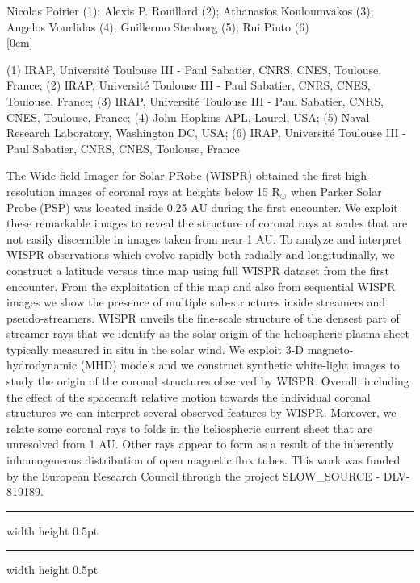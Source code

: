 \documentclass[a4paper,11pt]{book}
\def\doubleline{
\hrule width \hsize height 0.5pt  \kern 1mm \hrule width \hsize height 0.5pt 
}
\begin{document}
\begin{center}
{\large Nicolas Poirier (1)};{ \large Alexis P. Rouillard (2)};{ \large Athanasios Kouloumvakos (3)};{ \large Angelos Vourlidas (4)};{ \large Guillermo Stenborg (5)};{ \large Rui Pinto (6)}\\



[0cm]



     
  
\vspace{2 mm}
\noindent (1) IRAP, Université Toulouse III - Paul Sabatier, CNRS, CNES, Toulouse, France; (2) IRAP, Université Toulouse III - Paul Sabatier, CNRS, CNES, Toulouse, France; (3) IRAP, Université Toulouse III - Paul Sabatier, CNRS, CNES, Toulouse, France; (4) John Hopkins APL, Laurel, USA; (5) Naval Research Laboratory, Washington DC, USA; (6) IRAP, Université Toulouse III - Paul Sabatier, CNRS, CNES, Toulouse, France\\

\end{center}



  
\vspace{2 mm}
\noindent The Wide-field Imager for Solar PRobe (WISPR) obtained the first high-resolution images of coronal rays at heights below 15 R$_\odot$ when Parker Solar Probe (PSP) was located inside 0.25 AU during the first encounter. We exploit these remarkable images to reveal the structure of coronal rays at scales that are not easily discernible in images taken from near 1 AU. To analyze and interpret WISPR observations which evolve rapidly both radially and longitudinally, we construct a latitude versus time map using full WISPR dataset from the first encounter. From the exploitation of this map and also from sequential WISPR images we show the presence of multiple sub-structures inside streamers and pseudo-streamers. WISPR unveils the fine-scale structure of the densest part of streamer rays that we identify as the solar origin of the heliospheric plasma sheet typically measured in situ in the solar wind. We exploit 3-D magneto-hydrodynamic (MHD) models and we construct synthetic white-light images to study the origin of the coronal structures observed by WISPR. Overall, including the effect of the spacecraft relative motion towards the individual coronal structures we can interpret several observed features by WISPR. Moreover, we relate some coronal rays to folds in the heliospheric current sheet that are unresolved from 1 AU. Other rays appear to form as a result of the inherently inhomogeneous distribution of open magnetic flux tubes. This work was funded by the European Research Council through the project SLOW\_SOURCE - DLV-819189.

\noindent\doubleline
        


 

  
\printindex
\end{document}

